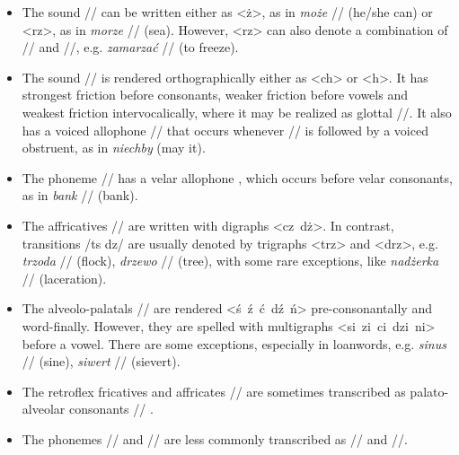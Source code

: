 \begin{itemize}
\item The sound // can be written either as <ż>, as in \textit{może} // (he/she can) or <rz>, as in \textit{morze} // (sea). However, <rz> can also denote a combination of // and //, e.g. \textit{zamarzać} // (to freeze).

\item The sound // is rendered orthographically either as <ch> or <h>. It has strongest friction before consonants, weaker friction before vowels and weakest friction intervocalically, where it may be realized as glottal //. It also has a voiced allophone // that occurs whenever // is followed by a voiced obstruent, as in \textit{niechby} (may it).

\item The phoneme // has a velar allophone , which occurs before velar consonants, as in \textit{bank} // (bank).

\item The  affricatives // are written with digraphs <cz~dż>. In contrast, transitions /t\:s d\:z/ are usually denoted by trigraphs <trz> and <drz>, e.g. \textit{trzoda} // (flock), \textit{drzewo} // (tree), with some rare exceptions, like \textit{nadżerka} // (laceration).

\item The alveolo-palatals // are rendered <ś~ź~ć~dź~ń> pre-consonantally and word-finally. However, they are spelled with multigraphs <si~zi~ci~dzi~ni> before a vowel. There are some exceptions, especially in loanwords, e.g. \textit{sinus} // (sine), \textit{siwert} // (sievert).

\item The retroflex fricatives and affricates // are sometimes transcribed as palato-alveolar consonants // \cite{jassem2003polish}.

\item The phonemes // and // are less commonly transcribed as // and /\textipa{\textbardotlessj}/.

  
\end{itemize}

